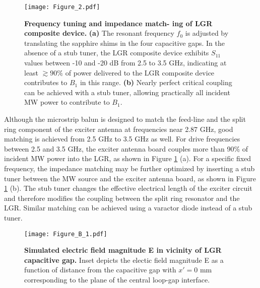 \begin{figure}[t!]
\centering
\texttt{[image: Figure\_2.pdf]}  
\caption{\textbf{Frequency tuning and impedance match-
ing of LGR composite device.} \textbf{(a)} The resonant frequency $f_0$ is adjusted by translating the sapphire shims in the four capacitive gaps. In the absence of a stub tuner, the LGR composite device exhibits $S_{11}$ values between -10 and -20 dB from 2.5 to 3.5 GHz, indicating at least $\gtrsim90\%$ of power delivered to the LGR composite device contributes to $B_1$ in this range. \textbf{(b)} Nearly perfect critical coupling can be achieved with
a stub tuner, allowing practically all incident MW power to contribute to $B_1$.}
\label{LGR_tuning}
\end{figure}

Although the microstrip balun is designed to match the feed-line and the split ring component of the exciter antenna at frequencies near 2.87 GHz, good matching is achieved from 2.5 GHz to 3.5 GHz as well. For drive frequencies between 2.5 and 3.5 GHz, the
exciter antenna board couples more than 90\% of incident MW power into the LGR, as shown in Figure \ref{LGR_tuning} (a). For a specific fixed frequency, the impedance matching may be further optimized by inserting a stub tuner between the MW source and the exciter antenna board, as shown in Figure \ref{LGR_tuning} (b). The stub tuner changes the effective electrical length of the exciter circuit and therefore modifies the coupling between the split ring resonator and the LGR. Similar matching can be achieved using a varactor diode instead of a stub tuner. 






\begin{figure}[t!]
\centering
\texttt{[image: Figure\_B\_1.pdf]}  
\caption{\textbf{Simulated electric field magnitude E in vicinity of LGR capacitive gap.} Inset depicts the electic field
magnitude E as a function of distance from the capacitive gap with $x' = 0$ mm corresponding to the plane of the central loop-gap interface.}
\label{LGR_Electric}
\end{figure}



